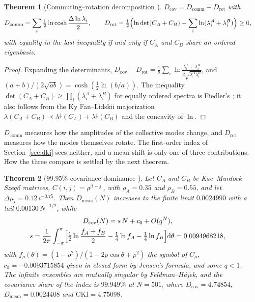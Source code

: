 \documentclass[11pt,reqno]{amsart}
\theoremstyle{plain}
\newtheorem{theorem}{Theorem}[section]
\theoremstyle{definition}
\theoremstyle{remark}
\numberwithin{equation}{section}
\newcommand{\dd}{\mathrm{d}}
\newcommand{\CKI}{\mathrm{CKI}}
\begin{document}
\begin{theorem}[Commuting--rotation decomposition \cite{ChenChen2026II}]\label{thm:decomp}
$D_{\mathrm{cov}}=D_{\mathrm{comm}}+D_{\mathrm{rot}}$ with
\begin{equation}\label{eq:decomp}
D_{\mathrm{comm}}=\sum_i\tfrac12\ln\cosh\frac{\Delta\ln\lambda_i}2,\qquad D_{\mathrm{rot}}=\tfrac12\Bigl(\ln\det(C_A+C_B)-\sum_i\ln(\lambda^A_i+\lambda^B_i)\Bigr)\ge0,
\end{equation}
with equality in the last inequality if and only if $C_A$ and $C_B$ share an ordered eigenbasis.
\end{theorem}

\begin{proof}
Expanding the determinants, $D_{\mathrm{cov}}-D_{\mathrm{rot}}=\tfrac12\sum_i\ln\frac{\lambda^A_i+\lambda^B_i}{2\sqrt{\lambda^A_i\lambda^B_i}}$, and $(a+b)/(2\sqrt{ab})=\cosh(\tfrac12\ln(b/a))$. The inequality $\det(C_A+C_B)\ge\prod_i(\lambda^A_i+\lambda^B_i)$ for equally ordered spectra is Fiedler's \cite{Fiedler1971}; it also follows from the Ky Fan--Lidskii majorization $\lambda(C_A+C_B)\prec\lambda^\downarrow(C_A)+\lambda^\downarrow(C_B)$ and the concavity of $\ln$.
\end{proof}

$D_{\mathrm{comm}}$ measures how the amplitudes of the collective modes change, and $D_{\mathrm{rot}}$ measures how the modes themselves rotate. The first-order index of Section~\ref{sec:dki} sees neither, and a mean shift is only one of three contributions. How the three compare is settled by the next theorem.

\begin{theorem}[$99.95\%$ covariance dominance \cite{ChenChen2026II}]\label{thm:dominance}
Let $C_A$ and $C_B$ be Kac--Murdock--Szeg\H{o} matrices, $C(i,j)=\rho^{|i-j|}$, with $\rho_A=0.35$ and $\rho_B=0.55$, and let $\Delta\mu_i=0.12\,i^{-0.75}$. Then $D_{\mathrm{mean}}(N)$ increases to the finite limit $0.0024990$ with a tail $0.00130\,N^{-1/2}$, while
\begin{equation}\label{eq:szego}
\begin{gathered}
D_{\mathrm{cov}}(N)=s\,N+c_0+O(q^N),\\
s=\frac1{2\pi}\int_{-\pi}^{\pi}\Bigl[\tfrac12\ln\frac{f_A+f_B}2-\tfrac14\ln f_A-\tfrac14\ln f_B\Bigr]\dd\theta=0.0094968218,
\end{gathered}
\end{equation}
with $f_\rho(\theta)=(1-\rho^2)/(1-2\rho\cos\theta+\rho^2)$ the symbol of $C_\rho$, $c_0=-0.0093715854$ given in closed form by Jensen's formula, and some $q<1$. The infinite ensembles are mutually singular by Feldman--H\'ajek, and the covariance share of the index is $99.949\%$ at $N=501$, where $D_{\mathrm{cov}}=4.74854$, $D_{\mathrm{mean}}=0.0024408$ and $\CKI=4.75098$.
\end{theorem}
\end{document}
